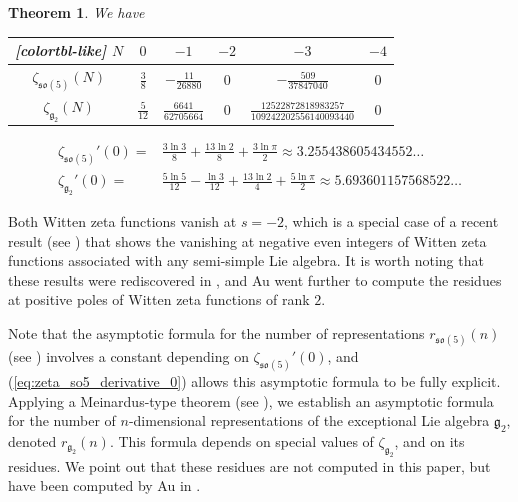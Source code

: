 \documentclass[a4paper]{amsart}
\newtheorem{maintheorem}{Theorem}
\theoremstyle{remark}
\theoremstyle{definition}
\begin{document}
\begin{maintheorem}
We have
\begin{table}[htbp]
\centering
\begin{NiceTabular}{|c|c|c|c|c|c|}[colortbl-like]
\toprule
$N$ & $0$ & $-1$ & $-2$ & $-3$ & $-4$ \\
\midrule
$\zeta_{\mathfrak{so}(5)}(N)$ & $\frac{3}{8}$ & $-\frac{11}{26880}$ & $0$ & $-\frac{509}{37847040}$ & $0$ \\
$\zeta_{\mathfrak{g}_2}(N)$ & $\frac{5}{12}$ & $\frac{6641}{62705664}$ & $0$ & $\frac{12522872818983257}{109242202556140093440}$ & $0$ \\
\bottomrule
\end{NiceTabular}
\end{table}
\begin{align}
    \zeta_{\mathfrak{so}(5)}'(0) =& \frac{3\ln 3}{8} + \frac{13\ln 2}{8} + \frac{3\ln \pi}{2} \approx 3.255438605434552\ldots \label{eq:zeta_so5_derivative_0} \\
    \zeta_{\mathfrak{g}_2}'(0) =& \frac{5\ln 5}{12} - \frac{\ln 3}{12} + \frac{13\ln 2}{4} + \frac{5\ln \pi}{2} \approx 5.693601157568522\ldots \label{eq:zeta_g_2_derivative_0}
\end{align}
\end{maintheorem}
Both Witten zeta functions vanish at $s=-2$, which is a special case of a recent result (see \cite{au2024vanishingwitten}) that shows the vanishing at negative even integers of Witten zeta functions associated with any semi-simple Lie algebra. It is worth noting that these results were rediscovered in \cite{au2025valueswitten}, and Au went further to compute the residues at positive poles of Witten zeta functions of rank $2$.

Note that the asymptotic formula for the number of representations $r_{\mathfrak{so}(5)}(n)$ (see \cite[Theorem 1.3]{bridges2024asymptotic}) involves a constant depending on $\zeta_{\mathfrak{so}(5)}'(0)$, and (\ref{eq:zeta_so5_derivative_0}) allows this asymptotic formula to be fully explicit. Applying a Meinardus-type theorem (see \cite[Theorem 4.4]{bridges2024asymptotic}), we establish an asymptotic formula for the number of $n$-dimensional representations of the exceptional Lie algebra $\mathfrak{g}_2$, denoted $r_{\mathfrak{g}_2}(n)$. This formula depends on special values of $\zeta_{\mathfrak{g}_2}$, and on its residues. We point out that these residues are not computed in this paper, but have been computed by Au in \cite[Example 10.4]{au2025valueswitten}.
\end{document}
